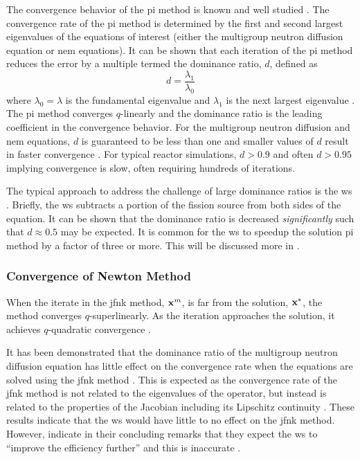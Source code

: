       The convergence behavior of the \gls{pi} method is known and well studied 
      \cite{nakamura,gehinThesis,my_ms_thesis}. The convergence rate of the
      \gls{pi} method is determined by the first and second largest eigenvalues
      of the equations of interest (either the multigroup neutron diffusion
      equation or \gls{nem} equations). It can be shown that each iteration of
      the \gls{pi} method reduces the error by a multiple termed the dominance
      ratio, $d$, defined as
      \begin{equation}
        \label{eq:dominance_ratio}
        d = \frac{\lambda_1}{\lambda_0}
      \end{equation}
      where $\lambda_0 = \lambda$ is the fundamental eigenvalue and $\lambda_1$
      is the next largest eigenvalue \cite{my_ms_thesis}. The \gls{pi} method
      converges $q$-linearly and the dominance ratio is the leading coefficient
      in the convergence behavior. For the multigroup neutron diffusion and
      \gls{nem} equations, $d$ is guaranteed to be less than one and smaller
      values of $d$ result in faster convergence \cite{nakamura}. For typical
      reactor simulations, $d > 0.9$ and often $d > 0.95$ implying convergence
      is slow, often requiring hundreds of iterations.

      The typical approach to address the challenge of large dominance ratios is
      the \gls{ws} \cite{gehinThesis}. Briefly, the \gls{ws} subtracts a portion
      of the fission source from both sides of the equation. It can be shown
      that the dominance ratio is decreased \textit{significantly} such that $d
      \approx 0.5$ may be expected. It is common for the \gls{ws} to speedup 
      the solution \gls{pi} method by a factor of three or more. This will be
      discussed more in .

    \subsubsection{Convergence of Newton Method}

      When the iterate in the \gls{jfnk} method, $\mathbf{x}^m$, is far from the
      solution, $\mathbf{x}^*$, the method converges $q$-superlinearly. As the
      iteration approaches the solution, it achieves $q$-quadratic convergence
      \cite{textbookkelley}.

      It has been demonstrated that the dominance ratio of the multigroup
      neutron diffusion equation has little effect on the convergence rate when
      the equations are solved using the \gls{jfnk} method \cite{gill_azmy}.
      This is expected as the convergence rate of the \gls{jfnk} method is not
      related to the eigenvalues of the operator, but instead is related to the
      properties of the Jacobian including its Lipschitz continuity
      \cite{textbookkelley}. These results indicate that the \gls{ws} would have
      little to no effect on the \gls{jfnk} method. However,
      \citeauthor{qe2paper} indicate in their concluding remarks that they
      expect the \gls{ws} to ``improve the efficiency further'' and this is
      inaccurate \cite{qe2paper}.
      
